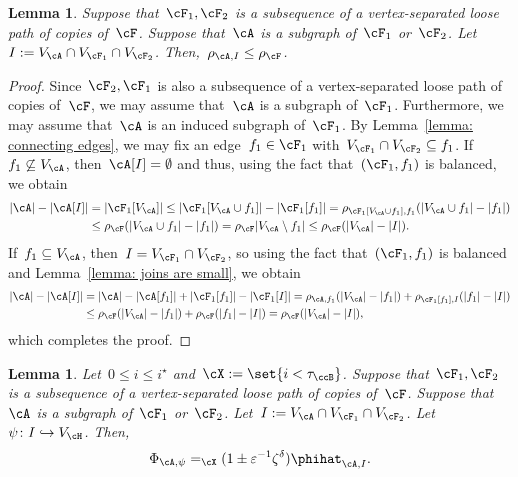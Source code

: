 \documentclass[11pt]{amsart}
\newcommand{\eps}{\varepsilon}
\DeclarePairedDelimiter{\abs}{\lvert}{\rvert}
\newcommand{\Xeq}{=_{\cX}}
\newcommand{\injection}{\hookrightarrow}
\newtheorem{lemma}[algocf]{Lemma}
\theoremstyle{definition}
\numberwithin{equation}{section}
\begin{document}
	
	\begin{lemma}\label{lemma: subextension of cF density}
		Suppose that~$\cF_1,\cF_2$ is a subsequence of a vertex-separated loose path of copies of~$\cF$.
		Suppose that~$\cA$ is a subgraph of~$\cF_1$ or~$\cF_2$.
		Let~$I:=V_\cA\cap V_{\cF_1}\cap V_{\cF_2}$.
		Then,~$\rho_{\cA,I}\leq \rho_\cF$.
	\end{lemma}
	\begin{proof}
		Since~$\cF_2,\cF_1$ is also a subsequence of a vertex-separated loose path of copies of~$\cF$, we may assume that~$\cA$ is a subgraph of~$\cF_1$.
		Furthermore, we may assume that~$\cA$ is an induced subgraph of~$\cF_1$.
		By Lemma~\ref{lemma: connecting edges}, we may fix an edge~$f_1\in\cF_1$ with~$V_{\cF_1}\cap V_{\cF_2}\subseteq f_1$.
		If~$f_1\not\subseteq V_\cA$, then~$\cA[I]=\emptyset$ and thus, using the fact that~$(\cF_1,f_1)$ is balanced, we obtain
		\begin{equation*}
			\begin{aligned}
				\abs{\cA}-\abs{\cA[I]}
				&=\abs{\cF_1[V_\cA]}
				\leq \abs{\cF_1[V_\cA\cup f_1]}-\abs{\cF_1[f_1]}
				=\rho_{\cF_1[V_\cA\cup f_1],f_1}(\abs{V_\cA\cup f_1}-\abs{f_1})\\
				&\leq \rho_{\cF}(\abs{V_\cA\cup f_1}-\abs{f_1})
				=\rho_{\cF}\abs{V_\cA\setminus f_1}
				\leq \rho_{\cF}(\abs{V_\cA}-\abs{I}).
			\end{aligned}
		\end{equation*}
		If~$f_1\subseteq V_\cA$, then~$I=V_{\cF_1}\cap V_{\cF_2}$, so using the fact that~$(\cF_1,f_1)$ is balanced and Lemma~\ref{lemma: joins are small}, we obtain
		\begin{equation*}
			\begin{aligned}
				\abs{\cA}-\abs{\cA[I]}
				&= \abs{\cA}-\abs{\cA[f_1]}+\abs{\cF_1[f_1]}-\abs{\cF_1[I]}
				=\rho_{\cA,f_1}(\abs{V_\cA}-\abs{f_1})+\rho_{\cF_1[f_1],I}(\abs{f_1}-\abs{I})\\
				&\leq \rho_{\cF}(\abs{V_\cA}-\abs{f_1})+\rho_{\cF}(\abs{f_1}-\abs{I})
				=\rho_{\cF}(\abs{V_\cA}-\abs{I}),
			\end{aligned}
		\end{equation*}
		which completes the proof.
	\end{proof}
	
	\begin{lemma}\label{lemma: subextension of cF}
		Let~$0\leq i\leq i^\star$ and~$\cX:=\set{i<\tau_{\ccB}}$.
		Suppose that~$\cF_1,\cF_2$ is a subsequence of a vertex-separated loose path of copies of~$\cF$.
		Suppose that~$\cA$ is a subgraph of~$\cF_1$ or~$\cF_2$.
		Let~$I:=V_\cA\cap V_{\cF_1}\cap V_{\cF_2}$.
		Let~$\psi\colon I\injection V_\cH$.
		Then,
		\begin{equation*}
			\Phi_{\cA,\psi}\Xeq (1\pm \eps^{-1}\zeta^\delta)\phihat_{\cA,I}.
		\end{equation*}
	\end{lemma}
	
\end{document}
